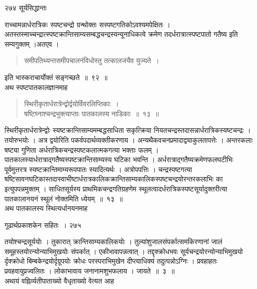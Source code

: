 \documentclass[11pt, openany]{book}
\begin{document}
\newpage
\noindent २७४ \hspace{4cm} सूर्यसिद्धान्तः
\vspace{1cm}


\noindent राच्चामन्नार्धरात्रिकः स्पष्टचन्द्रो ग्रन्थोक्तः सस्पष्टगतिकोऽवश्यमपेक्षितः । अतस्तस्माच्चन्द्रात्स्पष्टक्रान्तिसाम्यसम्बद्धचन्द्रस्यन्यूनाधिकत्वे क्रमेण तदर्धरात्रात्स्पष्टपातो गतैष्य इति सम्यगुक्तम् ।अतएव ।

\begin{quote}
{\qt समीपतिथ्यन्तसमीपचालनंविधोस्तु तत्कालजयैव युज्यते~। }
\end{quote}
 इति भास्कराचार्योक्तं सङ्गच्छते~॥~९२~॥\\
 अथ स्पष्टपातकालज्ञानमाह \textendash

\begin{quote}
{\ssi स्थिरीकृतार्धरात्रेन्द्वोर्द्वयोर्विवरलिप्तिकाः~।\\
 षष्टिघ्नाश्चन्द्रभुक्त्याप्ताः पातकालस्य नाडिकाः~॥~१३~॥ }
\end{quote}
 स्थिरीकृतार्धरात्रेन्द्वोः स्यष्टक्रान्तिसाम्यमम्बद्धसाधिता सकृत्क्रिया नियतचन्द्रस्तदासन्नार्धरात्रिकस्यष्टचन्द्रः । तयोरुभयोः । अत्र द्वयोरिति पकर्वपदार्थव्यक्तीकरणाय । अन्यथैकवचनप्रमादाद्व्याकुलतापत्तेः । अन्तरकलाः षष्ट्या गुणिता अर्धरात्रिकचन्द्रस्पष्टकलात्मकगत्या भक्ताः फलम् । पातकालस्यार्धरात्राद्गतैष्यस्पष्टक्रान्तिसाम्यस्य घटिका भवन्ति । अर्धरात्राद्गतैष्यक्रमेणफलघटीभिः पूर्वमुत्तरत्र स्यष्टक्रान्तिमाम्यरूपपातः स्यादित्यर्थः । अत्रोपपत्तिः । चन्द्रस्पष्टगत्या षष्टिसावनघटिकास्तदास्वाभीष्टार्धरात्रकालिकक्रान्तिसाम्यकालिकस्पष्टचन्द्रयोरन्तरकलाभिः का इत्युपपन्नमुक्तम् । साधितसूर्यस्य प्राथमिकचन्द्रगतिग्रहणेम स्थूलत्वादर्धरात्रिकस्पष्टसूर्यादुक्तरीत्या पातकालानयनं स्थूलं नोक्तमिति ध्येयम्~॥~१३~॥\\
 \noindent अथ पातकालस्य स्थित्यर्धानयनमाह \textendash


\newpage

\hspace{3cm} गूढार्थप्रकाशकेन सहितः~। \hfill २७५ 
\vspace{1cm}


 तयोश्चन्द्रसूर्ययोः । तुकारात् क्रान्तिसाम्यकालिकयोः । तुल्यांशुजालसंपर्कात्समकिरणानां जालं समूहस्तयोरन्योन्याभिमुखयोः संपर्कात् । एकीभावापन्नत्वात् । तद्दृक्क्रोधभवः सूर्यचन्द्रयोरन्योन्याभिमुखयो र्दृक्क्रोधो बिम्बकेन्द्रयोर्दृग्रूपयोः क्रोधः परस्पराभिमुखेन दीप्त्याधिक्यं तदुत्पन्नोऽग्निः । प्रवहाहतः प्रवहवायुप्रज्वलितः । लोकाभावाय जनानामशुभफलाय । जायते~॥~३~॥\\
 \noindent अथायं वह्निर्व्यतीपाताख्यो वैधृताख्यो वेत्यत आह \textendash
\end{document}
